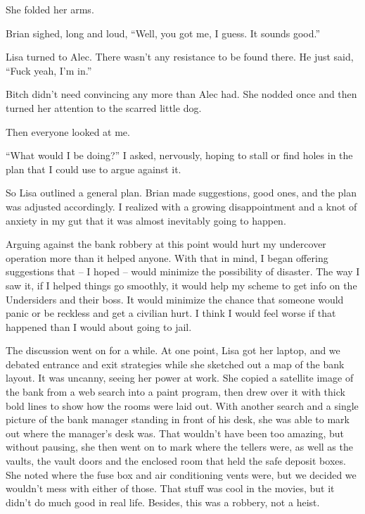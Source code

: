 She folded her arms.



Brian sighed, long and loud, ``Well, you got me, I guess.  It sounds good.''



Lisa turned to Alec.  There wasn't any resistance to be found there.  He just said, ``Fuck yeah, I'm in.''



Bitch didn't need convincing any more than Alec had. She nodded once and then turned her attention to the scarred little dog.



Then everyone looked at me.



``What would I be doing?'' I asked, nervously, hoping to stall or find holes in the plan that I could use to argue against it.



So Lisa outlined a general plan.  Brian made suggestions, good ones, and the plan was adjusted accordingly.  I realized with a growing disappointment and a knot of anxiety in my gut that it was almost inevitably going to happen.



Arguing against the bank robbery at this point would hurt my undercover operation more than it helped anyone.  With that in mind, I began offering suggestions that – I hoped – would minimize the possibility of disaster.  The way I saw it, if I helped things go smoothly, it would help my scheme to get info on the Undersiders and their boss.  It would minimize the chance that someone would panic or be reckless and get a civilian hurt.  I think I would feel worse if that happened than I would about going to jail.



The discussion went on for a while.  At one point, Lisa got her laptop, and we debated entrance and exit strategies while she sketched out a map of the bank layout.  It was uncanny, seeing her power at work.  She copied a satellite image of the bank from a web search into a paint program, then drew over it with thick bold lines to show how the rooms were laid out.  With another search and a single picture of the bank manager standing in front of his desk, she was able to mark out where the manager's desk was.  That wouldn't have been too amazing, but without pausing, she then went on to mark where the tellers were, as well as the vaults, the vault doors and the enclosed room that held the safe deposit boxes.  She noted where the fuse box and air conditioning vents were, but we decided we wouldn't mess with either of those.  That stuff was cool in the movies, but it didn't do much good in real life.  Besides, this was a robbery, not a heist.



